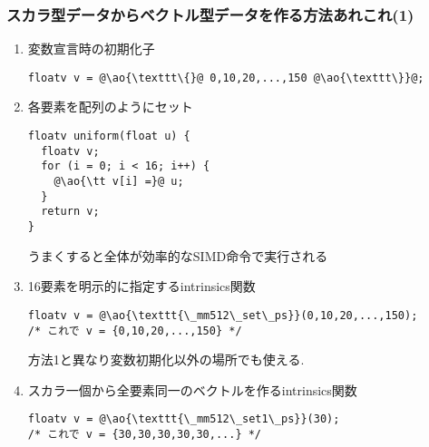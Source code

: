 \documentclass[10pt,dvipdfmx]{beamer}
\newcommand{\ao}[1]{{\color{blue}#1}}
\begin{document}
\begin{frame}[fragile]
\frametitle{スカラ型データからベクトル型データを作る方法あれこれ(1)}
\begin{enumerate}
\item 変数宣言時の初期化子
\begin{lstlisting}
floatv v = @\ao{\texttt\{}@ 0,10,20,...,150 @\ao{\texttt\}}@;
\end{lstlisting}

\item 各要素を配列のようにセット
\begin{lstlisting}
floatv uniform(float u) {    
  floatv v;
  for (i = 0; i < 16; i++) {
    @\ao{\tt v[i] =}@ u;
  }
  return v;
}  
\end{lstlisting}
うまくすると全体が効率的なSIMD命令で実行される

\item 16要素を明示的に指定するintrinsics関数
\begin{lstlisting}
floatv v = @\ao{\texttt{\_mm512\_set\_ps}}(0,10,20,...,150);
/* これで v = {0,10,20,...,150} */
\end{lstlisting}
方法1と異なり変数初期化以外の場所でも使える.

\item スカラ一個から全要素同一のベクトルを作るintrinsics関数
\begin{lstlisting}
floatv v = @\ao{\texttt{\_mm512\_set1\_ps}}(30);
/* これで v = {30,30,30,30,30,...} */
\end{lstlisting}
\end{enumerate}
\end{frame}

\iffalse
\begin{frame}[fragile]
\frametitle{スカラ型データからベクトル型データを作る方法あれこれ(2)}
\begin{enumerate}
   \setcounter{enumi}{3}
 \item スカラ型の配列から連続8要素をロードする
\begin{lstlisting}
float * a;
     ...
floatv v = @\ao{\texttt{*}}@((floatv *)(&a[i]));
/* これで v = {a[i],a[i+1], ...,a[i+7]} */     
\end{lstlisting}

\item 同じことを関数で
\begin{lstlisting}
float * a;
     ...
floatv v = @\ao{\texttt{\_mm256\_load\_ps}}@(&a[i]);
floatv v = @\ao{\texttt{\_mm256\_loadu\_ps}}@(&a[i]);
/* これで v = {a[i],a[i+1], ...,a[i+7]} */     
\end{lstlisting}
\end{enumerate}
\end{frame}
\fi
\end{document}
